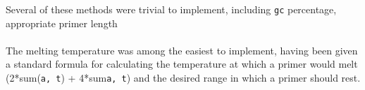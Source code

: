 Several of these methods were trivial to implement, including \verb£gc£ 
percentage, appropriate primer length
\\ \\
The melting temperature was among the easiest to implement, having been
given a standard formula for calculating the temperature at which a primer
would melt (2*sum(\verb£a, t£) + 4*sum\verb£a, t£) and the desired range
in which a primer should rest.
\\ \\

